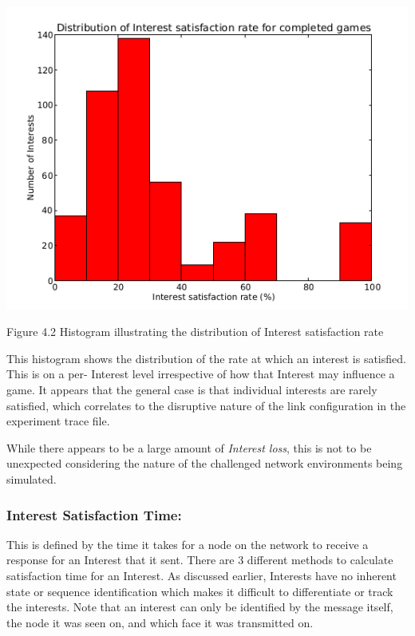 \documentclass[a4paper,12pt]{report}      %
\begin{document}
\includegraphics[scale=0.73]{InterestSatisfactionRateHist.jpg}

\begin{center}Figure 4.2 Histogram illustrating the distribution of Interest satisfaction rate\end{center}

This histogram shows the distribution of the rate at which an interest is satisfied. This is on a per-
Interest level irrespective of how that Interest may influence a game. It appears that the general case is
that individual interests are rarely satisfied, which correlates to the disruptive nature of the link
configuration in the experiment trace file.

While there appears to be a large amount of \emph{Interest loss}, this is not to be unexpected
considering the nature of the challenged network environments being simulated.

\subsubsection{Interest Satisfaction Time:}

This is defined by the time it takes for a node on the network to receive a response for an Interest that it
sent. There are 3 different methods to calculate satisfaction time for an Interest. As discussed earlier,
Interests have no inherent state or sequence identification which makes it difficult to differentiate or
track the interests. Note that an interest can only be identified by the message itself, the node it was
seen on, and which face it was transmitted on.
\end{document}
